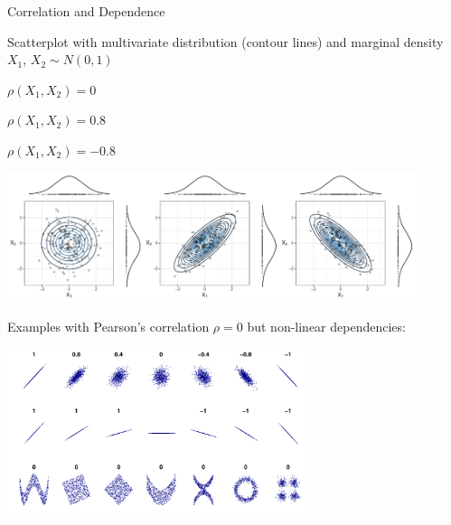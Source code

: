 \documentclass[11pt,compress,t,notes=noshow, aspectratio=169, xcolor=table]{beamer}
\begin{document}
\begin{frame}{Correlation and Dependence}

Scatterplot with multivariate distribution (contour lines) and marginal density $X_1$, $X_2 \sim N(0,1)$ 

\begin{center}
\begin{minipage}[t]{0.3\textwidth}
\centering
 $\rho(X_1, X_2) = 0$
\end{minipage}
\begin{minipage}[t]{0.3\textwidth}
\centering
 $\rho(X_1, X_2) = 0.8$
\end{minipage}
\begin{minipage}[t]{0.3\textwidth}
\centering
 $\rho(X_1, X_2) = -0.8$
\end{minipage}
\includegraphics[width = 0.9\textwidth]{figure/dnorm_correlation.pdf}
\end{center}

\pause

Examples with Pearson's correlation $\rho = 0$ but non-linear dependencies:

\centering
\includegraphics[width = 0.65\textwidth, trim=0 0 0 190px, clip]{figure/dependence_2}
\end{frame}
\end{document}
